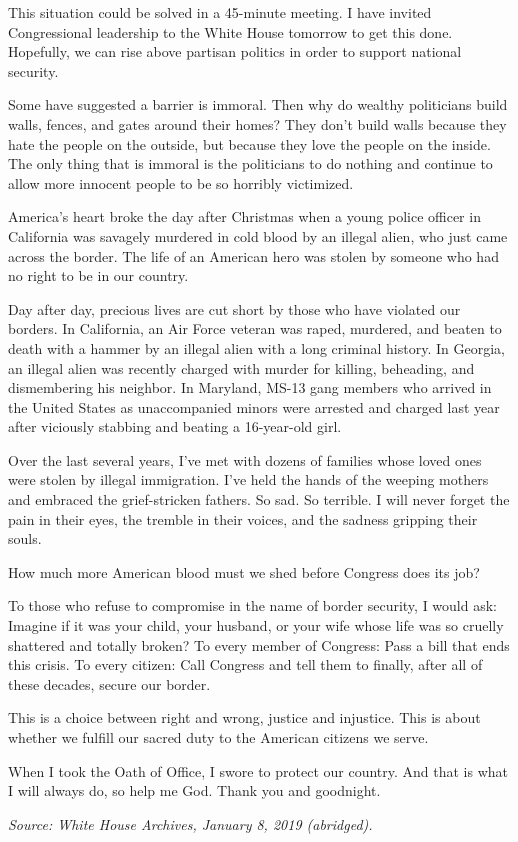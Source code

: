 \documentclass[10pt,a4paper]{article}
\begin{document}
This situation could be solved in a 45-minute meeting.  I have invited Congressional leadership to the White House tomorrow to get this done.  Hopefully, we can rise above partisan politics in order to support national security.

Some have suggested a barrier is immoral.  Then why do wealthy politicians build walls, fences, and gates around their homes?  They don’t build walls because they hate the people on the outside, but because they love the people on the inside.  The only thing that is immoral is the politicians to do nothing and continue to allow more innocent people to be so horribly victimized.

America’s heart broke the day after Christmas when a young police officer in California was savagely murdered in cold blood by an illegal alien, who just came across the border.  The life of an American hero was stolen by someone who had no right to be in our country.

Day after day, precious lives are cut short by those who have violated our borders.  In California, an Air Force veteran was raped, murdered, and beaten to death with a hammer by an illegal alien with a long criminal history.  In Georgia, an illegal alien was recently charged with murder for killing, beheading, and dismembering his neighbor.  In Maryland, MS-13 gang members who arrived in the United States as unaccompanied minors were arrested and charged last year after viciously stabbing and beating a 16-year-old girl.

Over the last several years, I’ve met with dozens of families whose loved ones were stolen by illegal immigration.  I’ve held the hands of the weeping mothers and embraced the grief-stricken fathers.  So sad.  So terrible.  I will never forget the pain in their eyes, the tremble in their voices, and the sadness gripping their souls.

How much more American blood must we shed before Congress does its job?

To those who refuse to compromise in the name of border security, I would ask: Imagine if it was your child, your husband, or your wife whose life was so cruelly shattered and totally broken?
To every member of Congress: Pass a bill that ends this crisis.
To every citizen: Call Congress and tell them to finally, after all of these decades, secure our border.

This is a choice between right and wrong, justice and injustice.  This is about whether we fulfill our sacred duty to the American citizens we serve.

When I took the Oath of Office, I swore to protect our country.  And that is what I will always do, so help me God.
Thank you and goodnight.

\bigskip
\noindent\textit{Source: White House Archives, January 8, 2019 (abridged).}
\end{document}
